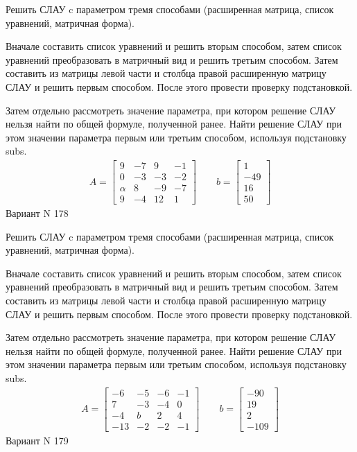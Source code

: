 \documentclass[11pt]{report}
\begin{document}
Решить СЛАУ c параметром тремя способами (расширенная матрица, список уравнений, матричная форма).

Вначале составить список уравнений и решить вторым способом,
затем список уравнений преобразовать в матричный вид и решить третьим способом.
Затем составить из матрицы левой части и столбца правой расширенную матрицу СЛАУ и решить первым способом.
После этого провести проверку подстановкой.

Затем отдельно рассмотреть значение параметра, при котором решение СЛАУ нельзя найти по общей формуле,
полученной ранее.
Найти решение СЛАУ при этом значении параметра первым или третьим способом, используя подстановку subs.
\begin{align*}
    A = \left[\begin{matrix}9 & -7 & 9 & -1\\0 & -3 & -3 & -2\\\alpha & 8 & -9 & -7\\9 & -4 & 12 & 1\end{matrix}\right]
\qquad b = \left[\begin{matrix}1\\-49\\16\\50\end{matrix}\right]
\end{align*}
\newpage
Вариант N 178


Решить СЛАУ c параметром тремя способами (расширенная матрица, список уравнений, матричная форма).

Вначале составить список уравнений и решить вторым способом,
затем список уравнений преобразовать в матричный вид и решить третьим способом.
Затем составить из матрицы левой части и столбца правой расширенную матрицу СЛАУ и решить первым способом.
После этого провести проверку подстановкой.

Затем отдельно рассмотреть значение параметра, при котором решение СЛАУ нельзя найти по общей формуле,
полученной ранее.
Найти решение СЛАУ при этом значении параметра первым или третьим способом, используя подстановку subs.
\begin{align*}
    A = \left[\begin{matrix}-6 & -5 & -6 & -1\\7 & -3 & -4 & 0\\-4 & b & 2 & 4\\-13 & -2 & -2 & -1\end{matrix}\right]
\qquad b = \left[\begin{matrix}-90\\19\\2\\-109\end{matrix}\right]
\end{align*}
\newpage
Вариант N 179
\end{document}
